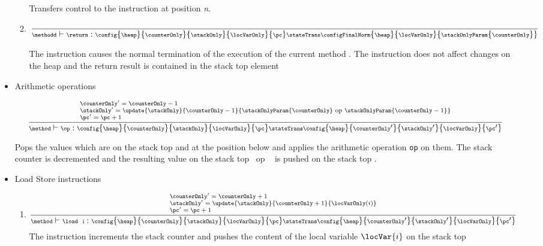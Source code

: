 \begin{itemize}
\begin{enumerate}
   
             Transfers control to the instruction at position \textit{n}.


      \item \return
        $$ {\scriptsize \frac{ } 
            {\methodd \vdash \return :\config{\heap}{\counterOnly}{\stackOnly}{\locVarOnly}{\pc} 
		                    \stateTrans 
                                    \configFinalNorm{\heap}{\locVarOnly}{\stackOnlyParam{\counterOnly}}}   }  $$

	    The instruction causes the normal termination of the execution of the current method \methodd.
	    The instruction does not affect changes on the heap \heap and the return result is contained in
	    the stack top element \stackOnlyParam{\counterOnly}
      \end{enumerate}

  \item Arithmetic operations 	
        
	   $${\scriptsize \frac{ 
	   \begin{array}{l}
	   \counterOnly' = \counterOnly - 1 \\
	   \stackOnly' = \update{\stackOnly} {\counterOnly-1}{\stackOnlyParam{\counterOnly} \ \rm{op} \ \stackOnlyParam{\counterOnly-1}} \\
	   \pc' = \pc + 1
	   \end{array}}
		   {\method \vdash  \op :\config{\heap}{\counterOnly}{\stackOnly}{\locVarOnly}{\pc} 
		          \stateTrans 
                          \config{\heap}{\counterOnly'}{\stackOnly' }{\locVarOnly}{\pc'} } } $$ 
		 
 
       Pops the values which are on the stack top \stackOnlyParam{\counterOnly}  and   at the position below and applies the arithmetic operation \texttt{op}
       on them. The stack counter is decremented and  the resulting  value on the stack top  \ \rm{op} \ \stackOnlyParam{\counterOnly} is pushed on the stack
       top  . 

  \item Load Store instructions

      \begin{enumerate}
    
	\item \load
	$${\scriptsize \frac{ \begin{array}{l}
	                \counterOnly' = \counterOnly + 1\\
			\stackOnly' = \update{\stackOnly}{\counterOnly +  1}{ \locVarOnly(i) } \\
			\pc' = \pc + 1
	          \end{array}
	    } 
	    {\method \vdash \load \ \mbox{ \rm i}  : \config{\heap}{\counterOnly}{\stackOnly}{\locVarOnly}{\pc} 
		  \stateTrans 
                  \config{\heap}{\counterOnly'}{\stackOnly'}{\locVarOnly}{\pc'}  } } $$ 
            The instruction increments the stack counter  \counterOnly and pushes
	    the content of the local variable $\locVar{i}$ on the stack top 
	    

\end{enumerate}
\end{itemize}
